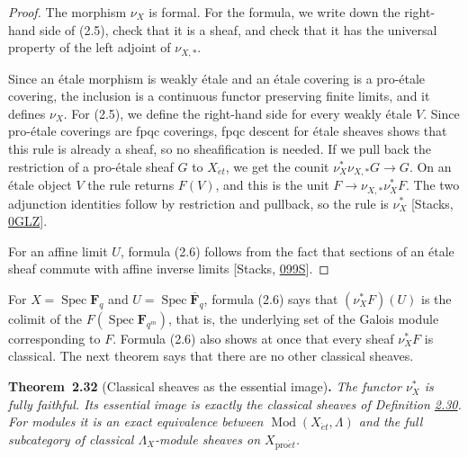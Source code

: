 \documentclass[11pt]{article}
\newenvironment{bpstatement}[2]{\par\addvspace{0.6\baselineskip}\noindent\textbf{#1}#2\textbf{.}\enspace\ignorespaces}
  {\par\addvspace{0.4\baselineskip}}
\newenvironment{bpstatementit}[2]{\begin{bpstatement}{#1}{#2}\itshape\ignorespaces}{\end{bpstatement}}
\begin{document}
\begin{proof}[{Proof}]\label{bp93}%
The morphism \(\nu_X\) is formal. For the formula, we write down the right-hand side of (2.5), check that it is a sheaf, and check that it has the universal property of the left adjoint of \(\nu_{X,*}\).

Since an étale morphism is weakly étale and an étale covering is a pro-étale covering, the inclusion is a continuous functor preserving finite limits, and it defines \(\nu_X\). For (2.5), we define the right-hand side for every weakly étale \(V\). Since pro-étale coverings are fpqc coverings, fpqc descent for étale sheaves shows that this rule is already a sheaf, so no sheafification is needed. If we pull back the restriction of a pro-étale sheaf \(G\) to \(X_{\acute{e}t}\), we get the counit \(\nu_X^*\nu_{X,*}G\to G\). On an étale object \(V\) the rule returns \(F(V)\), and this is the unit \(F\to\nu_{X,*}\nu_X^*F\). The two adjunction identities follow by restriction and pullback, so the rule is \(\nu_X^*\) [Stacks, \href{https://stacks.math.columbia.edu/tag/0GLZ}{0GLZ}].

For an affine limit \(U\), formula (2.6) follows from the fact that sections of an étale sheaf commute with affine inverse limits [Stacks, \href{https://stacks.math.columbia.edu/tag/099S}{099S}].
\end{proof}

\label{bp94}%
For \(X=\operatorname{Spec}\mathbf F_q\) and \(U=\operatorname{Spec}\overline{\mathbf F}_q\), formula (2.6) says that \((\nu_X^*F)(U)\) is the colimit of the \(F(\operatorname{Spec}\mathbf F_{q^m})\), that is, the underlying set of the Galois module corresponding to \(F\). Formula (2.6) also shows at once that every sheaf \(\nu_X^*F\) is classical. The next theorem says that there are no other classical sheaves.

\label{bp95}%
\begin{bpstatementit}{Theorem~2.32}{ (Classical sheaves as the essential image)}
The functor \(\nu_X^*\) is fully faithful. Its essential image is exactly the classical sheaves of Definition \hyperref[bp91]{2.30}. For modules it is an exact equivalence between \(\operatorname{Mod}(X_{\acute{e}t},\Lambda)\) and the full subcategory of classical \(\Lambda_X\)-module sheaves on \(X_{\mathrm{pro}\acute{e}t}\).
\end{bpstatementit}
\end{document}
